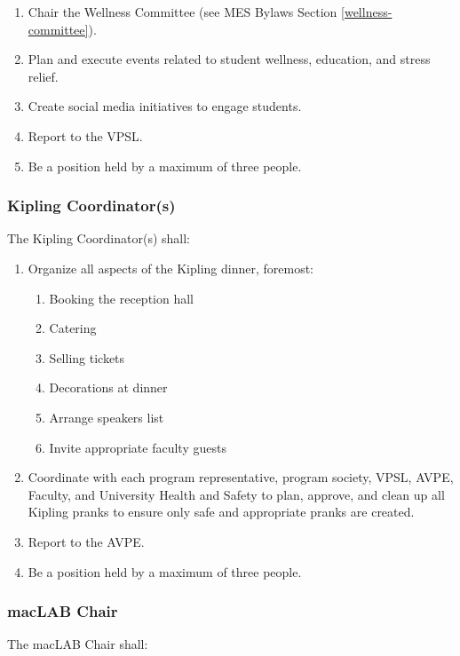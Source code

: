 \begin{enumerate}
 \item
  Chair the Wellness Committee (see MES Bylaws Section \ref{wellness-committee}).
 \item
  Plan and execute events related to student wellness, education, and stress relief.
 \item
  Create social media initiatives to engage students.
 \item
  Report to the VPSL.
 \item
  Be a position held by a maximum of three people.

\end{enumerate}

\subsubsection{Kipling Coordinator(s)}
\label{kipling-coordinators}
The Kipling Coordinator(s) shall:

\begin{enumerate}
 \item
  Organize all aspects of the Kipling dinner, foremost:

  \begin{enumerate}
   \item
    Booking the reception hall
   \item
    Catering
   \item
    Selling tickets
   \item
    Decorations at dinner
   \item
    Arrange speakers list
   \item
    Invite appropriate faculty guests
  \end{enumerate}
 \item
  Coordinate with each program representative, program society, VPSL, AVPE, Faculty, and University Health and Safety to plan, approve, and clean up all Kipling pranks to ensure only safe and appropriate pranks are created.
 \item
  Report to the AVPE.
 \item
  Be a position held by a maximum of three people.

\end{enumerate}
\subsubsection{macLAB Chair}
\label{maclab-chair}

The macLAB Chair shall:

